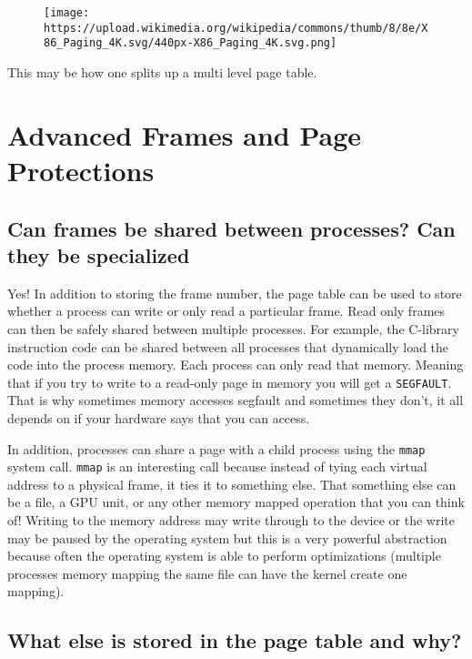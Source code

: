 \begin{figure}[htbp]
\centering
\texttt{[image: https://upload.wikimedia.org/wikipedia/commons/thumb/8/8e/X86\_Paging\_4K.svg/440px-X86\_Paging\_4K.svg.png]}
\caption{}
\end{figure}

This may be how one splits up a multi level page table.

\section{Advanced Frames and Page
Protections}\label{advanced-frames-and-page-protections}

\subsection{Can frames be shared between processes? Can they be
specialized}\label{can-frames-be-shared-between-processes-can-they-be-specialized}

Yes! In addition to storing the frame number, the page table can be used
to store whether a process can write or only read a particular frame.
Read only frames can then be safely shared between multiple processes.
For example, the C-library instruction code can be shared between all
processes that dynamically load the code into the process memory. Each
process can only read that memory. Meaning that if you try to write to a
read-only page in memory you will get a \texttt{SEGFAULT}. That is why
sometimes memory accesses segfault and sometimes they don't, it all
depends on if your hardware says that you can access.

In addition, processes can share a page with a child process using the
\texttt{mmap} system call. \texttt{mmap} is an interesting call because
instead of tying each virtual address to a physical frame, it ties it to
something else. That something else can be a file, a GPU unit, or any
other memory mapped operation that you can think of! Writing to the
memory address may write through to the device or the write may be
paused by the operating system but this is a very powerful abstraction
because often the operating system is able to perform optimizations
(multiple processes memory mapping the same file can have the kernel
create one mapping).

\subsection{What else is stored in the page table and
why?}\label{what-else-is-stored-in-the-page-table-and-why}

